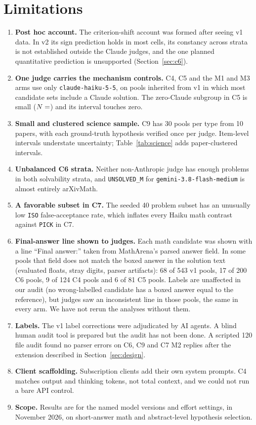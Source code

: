 \documentclass[10pt,twocolumn]{article}
\makeatletter
\newcommand{\res}[1]{\csname res@#1\endcsname}
\makeatother
\begin{document}
\section{Limitations}
\begin{enumerate}\setlength{\itemsep}{2pt}
\item \textbf{Post hoc account.} The criterion-shift account was formed after seeing v1 data. In v2 its sign prediction holds in most cells, its constancy across strata is not established outside the Claude judges, and the one planned quantitative prediction is unsupported (Section~\ref{sec:c6}).
\item \textbf{One judge carries the mechanism controls.} C4, C5 and the M1 and M3 arms use only \texttt{claude-haiku-5-5}, on pools inherited from v1 in which most candidate sets include a Claude solution. The zero-Claude subgroup in C5 is small ($N=\res{c5o_all_cl0_n}$) and its interval touches zero.
\item \textbf{Small and clustered science sample.} C9 has 30 pools per type from 10 papers, with each ground-truth hypothesis verified once per judge. Item-level intervals understate uncertainty; Table~\ref{tab:science} adds paper-clustered intervals.
\item \textbf{Unbalanced C6 strata.} Neither non-Anthropic judge has enough problems in both solvability strata, and \texttt{UNSOLVED\_M} for \texttt{gemini-3.8-flash-medium} is almost entirely arXivMath.
\item \textbf{A favorable subset in C7.} The seeded 40 problem subset has an unusually low \texttt{ISO} false-acceptance rate, which inflates every Haiku math contrast against \texttt{PICK} in C7.
\item \textbf{Final-answer line shown to judges.} Each math candidate was shown with a line ``Final answer:'' taken from MathArena's parsed answer field. In some pools that field does not match the boxed answer in the solution text (evaluated floats, stray digits, parser artifacts): 68 of 543 v1 pools, 17 of 200 C6 pools, 9 of 124 C4 pools and 6 of 81 C5 pools. Labels are unaffected in our audit (no wrong-labelled candidate has a boxed answer equal to the reference), but judges saw an inconsistent line in those pools, the same in every arm. We have not rerun the analyses without them.
\item \textbf{Labels.} The v1 label corrections were adjudicated by AI agents. A blind human audit tool is prepared but the audit has not been done. A scripted 120 file audit found no parser errors on C6, C9 and C7 M2 replies after the extension described in Section~\ref{sec:design}.
\item \textbf{Client scaffolding.} Subscription clients add their own system prompts. C4 matches output and thinking tokens, not total context, and we could not run a bare API control.
\item \textbf{Scope.} Results are for the named model versions and effort settings, in November 2026, on short-answer math and abstract-level hypothesis selection.
\end{enumerate}
\end{document}
